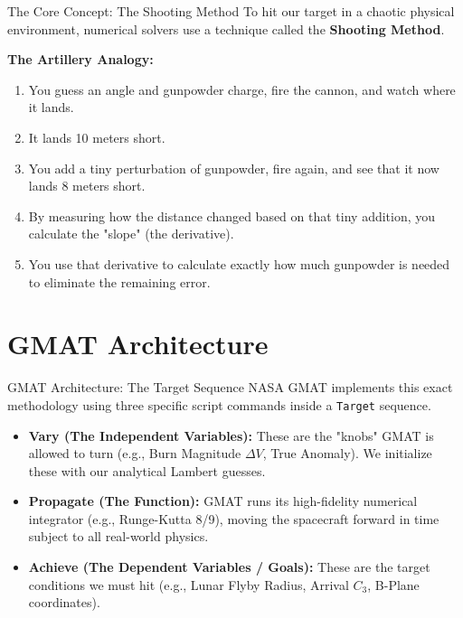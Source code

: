 \documentclass[11pt]{beamer}
\begin{document}
\begin{frame}{The Core Concept: The Shooting Method}
    To hit our target in a chaotic physical environment, numerical solvers use a technique called the \textbf{Shooting Method}. 
    
    \vspace{0.3cm}
    \textbf{The Artillery Analogy:}
    \begin{enumerate}
        \item You guess an angle and gunpowder charge, fire the cannon, and watch where it lands.
        \item It lands 10 meters short.
        \item You add a tiny perturbation of gunpowder, fire again, and see that it now lands 8 meters short.
        \item By measuring how the distance changed based on that tiny addition, you calculate the "slope" (the derivative).
        \item You use that derivative to calculate exactly how much gunpowder is needed to eliminate the remaining error.
    \end{enumerate}
\end{frame}

\section{GMAT Architecture}

\begin{frame}{GMAT Architecture: The Target Sequence}
    NASA GMAT implements this exact methodology using three specific script commands inside a \texttt{Target} sequence.
    
    \vspace{0.3cm}
    \begin{itemize}
        \item \textbf{Vary (The Independent Variables):} These are the "knobs" GMAT is allowed to turn (e.g., Burn Magnitude $\Delta V$, True Anomaly). We initialize these with our analytical Lambert guesses.
        \item \textbf{Propagate (The Function):} GMAT runs its high-fidelity numerical integrator (e.g., Runge-Kutta 8/9), moving the spacecraft forward in time subject to all real-world physics.
        \item \textbf{Achieve (The Dependent Variables / Goals):} These are the target conditions we must hit (e.g., Lunar Flyby Radius, Arrival $C_3$, B-Plane coordinates).
    \end{itemize}
\end{frame}
\end{document}
